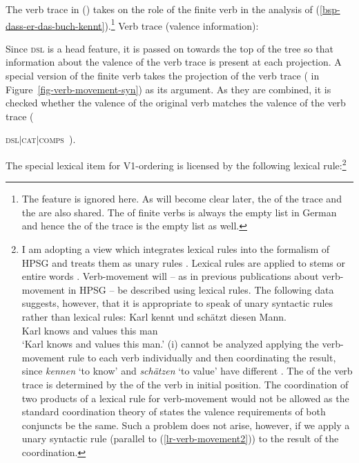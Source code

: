 {The verb trace in () takes on the role of the finite verb in the analysis of
(\ref{bsp-dass-er-das-buch-kennt}).\footnote{%
  The \spr feature is ignored here. As will become clear later, the \sprv of the trace and the
  \dslf are also shared. The \sprv of finite verbs is always the empty list in German and hence the
  \sprv of the trace is the empty list as well.
}
\eas
Verb trace (valence information):\\
\label{le-verbspur}
\zs


Since \textsc{dsl} is a head feature, it is passed on towards the top of the tree so that information
about the valence of the verb trace is present at each projection.
A special version of the finite verb takes the projection of the verb trace ( in Figure~\vref{fig-verb-movement-syn}) as its argument. As they are combined,
it is checked whether the valence of the original verb  matches the valence of the verb
trace ({\textsc{dsl$|$cat$|$comps} \,).

The special lexical item for V1-ordering is licensed by the following lexical rule:\footnote{\label{fn-koord-vm}%
		I am adopting a view which integrates lexical rules into the formalism of HPSG and treats them as
		unary rules \citep{Meurers2001a}.
		Lexical rules are applied to stems or entire words \citep{Mueller2002b}.
		Verb-movement will -- as in previous publications about verb-movement in HPSG -- be described using 
		lexical rules. The following data suggests, however, that it is appropriate to speak of unary syntactic rules rather than lexical rules:
		 \ea
        \gll Karl kennt und schätzt diesen Mann.\\
             Karl knows and values this man\\
	\glt `Karl knows and values this man.'
        \z
		(i) cannot be analyzed applying the verb-movement rule to each verb individually and then coordinating the
		result, since \emph{kennen} `to know' and \emph{schätzen} `to value' have different \contvs. The \contv
		of the verb trace is determined by the \contv of the verb in initial position. The coordination of two products of
		a lexical rule for verb-movement would not be allowed as the standard coordination theory of \citet[]{ps2} states
		the valence requirements of both conjuncts be the same. Such a problem does not arise, however, if we apply a unary syntactic 
		rule (parallel to (\ref{lr-verb-movement2})) to the result of the coordination.%
}


}}
